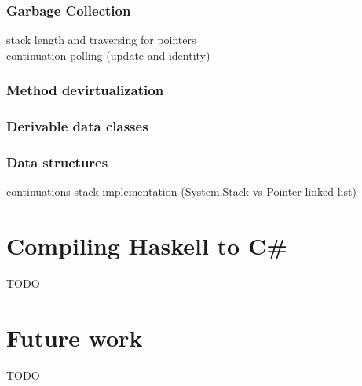 \documentclass[en]{pracamgr}
\begin{document}
\subsection{Garbage Collection}
stack length and traversing for pointers \\
continuation polling (update and identity)
\subsection{Method devirtualization}
\subsection{Derivable data classes}
\subsection{Data structures}
continuations stack implementation (System.Stack vs Pointer linked list) \\

\chapter{Compiling Haskell to C\#}\label{r:compiler}
TODO

\chapter{Future work}\label{r:future}
TODO
\end{document}
